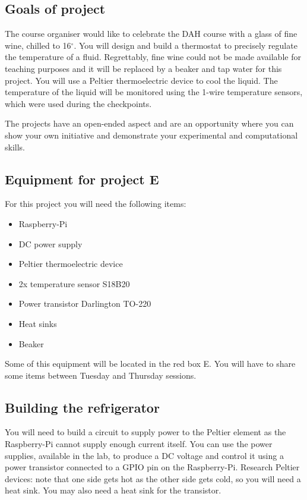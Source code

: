\subsection{Goals of project}

The course organiser would like to celebrate the DAH course with a glass of fine wine, chilled to 
 16$^\circ .$ You will design and build a thermostat to precisely regulate the temperature of a fluid. Regrettably, fine wine could not be made available for teaching purposes and it will be replaced by a beaker and tap water for this project. You will use a Peltier thermoelectric device to cool the liquid. The temperature of the liquid will be monitored using the 1-wire temperature sensors, which were used during the checkpoints.

The projects have an open-ended aspect and are an opportunity where you can show your own initiative and demonstrate your experimental and computational skills. 

\subsection{Equipment for project E}

For this project you will need the following items:
\begin{itemize}
\item Raspberry-Pi
\item DC power supply
\item Peltier thermoelectric device
\item 2x temperature sensor S18B20
\item Power transistor Darlington TO-220
\item Heat sinks
\item Beaker
\end{itemize}
Some of this equipment will be located in the red box E. You will have to share some items between Tuesday and Thursday sessions. 


\subsection{Building the refrigerator}

You will need to build a circuit to supply power to the Peltier element as the Raspberry-Pi cannot supply enough current itself. You can use the power supplies, available in the lab, to produce a DC voltage and control it using a power transistor connected to a GPIO pin on the Raspberry-Pi. 
Research Peltier devices: note that one side gets hot as the other side gets cold, so you will need a heat sink. You may also need a heat sink for the transistor.

